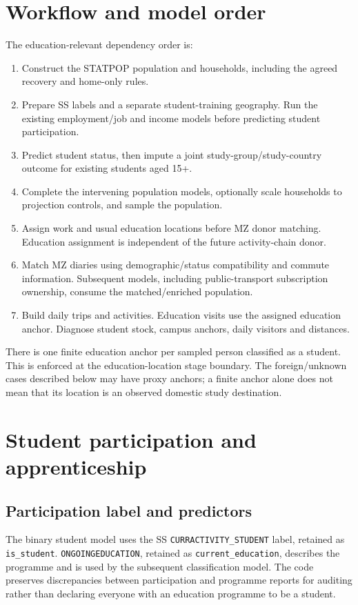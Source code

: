 \documentclass[11pt,a4paper]{article}
\newcommand{\code}[1]{\nolinkurl{#1}}
\begin{document}
\section{Workflow and model order}

The education-relevant dependency order is:
\begin{enumerate}
\item Construct the STATPOP population and households, including the agreed
recovery and home-only rules.
\item Prepare SS labels and a separate student-training geography. Run the
existing employment/job and income models before predicting student participation.
\item Predict student status, then impute a joint study-group/study-country
outcome for existing students aged 15+.
\item Complete the intervening population models, optionally scale households
to projection controls, and sample the population.
\item Assign work and usual education locations before MZ donor matching.
Education assignment is independent of the future activity-chain donor.
\item Match MZ diaries using demographic/status compatibility and commute
information. Subsequent models, including public-transport subscription
ownership, consume the matched/enriched population.
\item Build daily trips and activities. Education visits use the assigned
education anchor. Diagnose student stock, campus anchors, daily visitors and distances.
\end{enumerate}

There is one finite education anchor per sampled person classified as a
student. This is enforced at the education-location stage boundary. The
foreign/unknown cases described below may have proxy anchors; a finite anchor
alone does not mean that its location is an observed domestic study destination.

\section{Student participation and apprenticeship}
\subsection{Participation label and predictors}

The binary student model uses the SS \code{CURRACTIVITY_STUDENT} label,
retained as \code{is_student}. \code{ONGOINGEDUCATION}, retained as
\code{current_education}, describes the programme and is used by the subsequent
classification model. The code preserves discrepancies between participation
and programme reports for auditing rather than declaring everyone with an
education programme to be a student.
\end{document}
